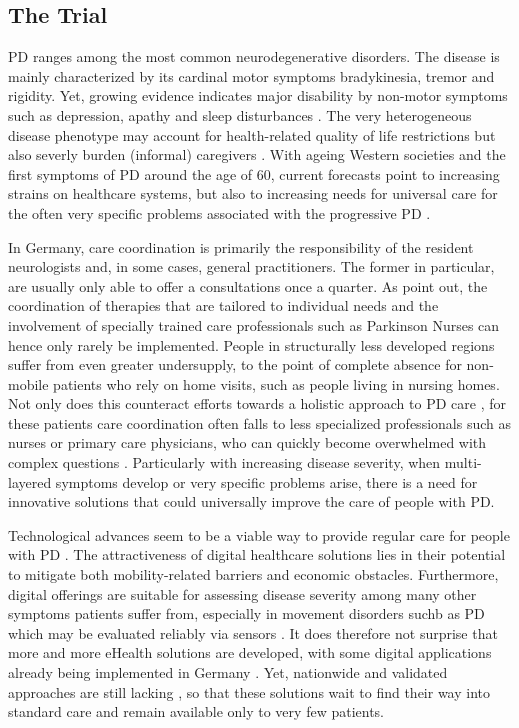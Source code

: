 \documentclass[number,12pt,review]{elsarticle}
\begin{document}
\label{backsec}

\subsection{The Trial}

\label{trialsec}

\ac{PD} ranges among the most common neurodegenerative disorders. The disease is mainly characterized by its cardinal motor symptoms bradykinesia, tremor and rigidity. Yet, growing evidence indicates major disability by non-motor symptoms such as depression, apathy and sleep disturbances \citep{Bloem2021-ov}. The very heterogeneous disease phenotype may account for health-related quality of life restrictions but also severly burden (informal) caregivers \citep{Kalia2015-ty}. With ageing Western societies and the first symptoms of \ac{PD} around the age of 60, current forecasts point to increasing strains on healthcare systems, but also to increasing needs for universal care for the often very specific problems associated with the progressive \ac{PD} \citep{Heinzel2018-ff, Dorsey2018-mc}.

In Germany, care coordination is primarily the responsibility of the resident neurologists and, in some cases, general practitioners. The former in particular, are usually only
able to offer a consultations once a quarter. As \citet{Prell2020-bc} point out, the coordination of therapies that are tailored to individual needs and the involvement of specially trained care professionals such as Parkinson Nurses can hence only rarely be implemented. People in structurally less developed regions suffer from even greater undersupply, to the point of complete absence for non-mobile patients who rely on home visits, such as people living in nursing homes. Not only does this counteract efforts towards a holistic approach to PD care \citep{rajan2020integrated}, for these patients care coordination often falls to less specialized professionals such as nurses or primary care physicians, who can quickly become overwhelmed with complex questions \citep{Stangl2020-na}. Particularly with increasing disease severity, when multi-layered symptoms develop or very specific problems arise, there is a need for innovative solutions that could universally improve the care of people with \ac{PD}.

Technological advances seem to be a viable way to provide regular care for people with \ac{PD} \citep{achey2014past}. The attractiveness of digital healthcare solutions lies in their potential to mitigate both mobility-related barriers and economic obstacles. Furthermore, digital offerings are suitable for assessing disease severity among many other
symptoms patients suffer from, especially in movement disorders suchb as \ac{PD} which may be evaluated reliably via sensors \citep{kleinholdermann2019remote, tabatabaei2020machine, Kleinholdermann2021-st}. It does therefore not surprise that more and more eHealth solutions are developed, with some digital applications already being implemented in Germany \citep{Stangl2020-na}. Yet, nationwide and validated approaches are still lacking \citep{van2020building}, so that these solutions wait to find their way into standard care and remain available only to very few patients.
\end{document}
